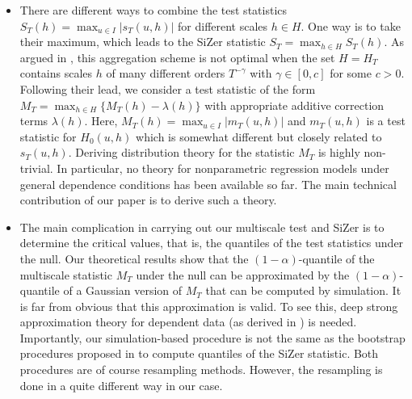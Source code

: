 \documentclass[a4paper,12pt]{article}
\begin{document}
\begin{itemize}[leftmargin=0.5cm]
\item There are different ways to combine the test statistics $S_T(h) = \max_{u \in I} |s_T(u,h)|$ for different scales $h \in H$. One way is to take their maximum, which leads to the SiZer statistic $S_T = \max_{h \in H} S_T(h)$. As argued in \cite{DuembgenSpokoiny2001}, this aggregation scheme is not optimal when the set $H = H_T$ contains scales $h$ of many different orders $T^{-\gamma}$ with $\gamma \in [0,c]$ for some $c > 0$. Following their lead, we consider a test statistic of the form $M_T = \max_{h \in H} \{ M_T(h) - \lambda(h) \}$ with appropriate additive correction terms $\lambda(h)$. Here, $M_T(h) = \max_{u \in I} |m_T(u,h)|$ and $m_T(u,h)$ is a test statistic for $H_0(u,h)$ which is somewhat different but closely related to $s_T(u,h)$. Deriving distribution theory for the statistic $M_T$ is highly non-trivial. In particular, no theory for nonparametric regression models under general dependence conditions has been available so far. The main technical contribution of our paper is to derive such a theory. %

\item The main complication in carrying out our multiscale test and SiZer is to determine the critical values, that is, the quantiles of the test statistics under the null. Our theoretical results show that the $(1-\alpha)$-quantile of the multiscale statistic $M_T$ under the null can be approximated by the $(1-\alpha)$-quantile of a Gaussian version of $M_T$ that can be computed by simulation. It is far from obvious that this approximation is valid. To see this, deep strong approximation theory for dependent data (as derived in \cite{BerkesliuWu2014}) is needed. Importantly, our simulation-based procedure is not the same as the bootstrap procedures proposed in \cite{ChaudhuriMarron1999, ChaudhuriMarron2000} to compute quantiles of the SiZer statistic. Both procedures are of course resampling methods. However, the resampling is done in a quite different way in our case. 


\end{itemize}
\end{document}
